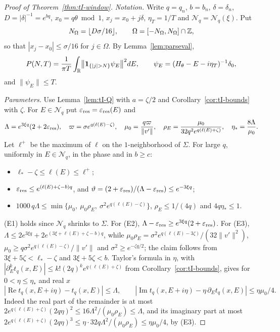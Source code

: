 \begin{proof}[Proof of Theorem~\ref{thm:tI-window}]
\emph{Notation.} Write $q=q_n$, $b=b_n$, $\delta=\delta_n$, $D=|\delta|^{-1}=e^{bq}$, $x_0=q\theta\bmod1$, $x_j=x_0+j\delta$, $\eta_T=1/T$ and $\mathcal N_q=\mathcal N_q(\xi)$. Put
\[
N_\Omega=\lfloor D\sigma/16\rfloor,\qquad\Omega=[-N_\Omega,N_\Omega]\cap\mathbb Z,
\]
so that $|x_j-x_0|\le\sigma/16$ for $j\in\Omega$. By Lemma~\ref{lem:parseval},
\begin{equation}\label{eq:tI-parseval}
P(N,T)=\frac1{\pi T}\int_\R\bigl\|\un_{\{|j|>N\}}\psi_E\bigr\|^2dE,\qquad\psi_E=(H_\theta-E-i\eta_T)^{-1}\delta_0,
\end{equation}
and $\|\psi_E\|\le T$.

\emph{Parameters.} Use Lemma~\ref{lem:tI-Q} with $a=\zeta/2$ and Corollary~\ref{cor:tI-bounds} with $\zeta$. For $E\in\mathcal N_q$ put $\varepsilon_{\mathrm{res}}=\varepsilon_{\mathrm{res}}(E)$ and
\[
\Lambda=e^{3\xi q}(2+2\varepsilon_{\mathrm{res}}),\quad\varpi=\sigma e^{q(\ell(E)-\zeta)},\quad\mu_0=\frac{q\varpi}{\|v'\|},\quad\rho_E=\frac{\mu_0}{32q^2e^{q(\ell(E)+\zeta)}},\quad\eta_*=\frac{8\Lambda}{\mu_0}.
\]
Let $\ell^+$ be the maximum of $\ell$ on the $1$-neighborhood of $\Sigma$. For large $q$, uniformly in $E\in\mathcal N_q$, in the phase and in $b\ge c$:
\begin{itemize}
\item[(E1)] $\ell_*-\zeta\le\ell(E)\le\ell^+$;
\item[(E2)] $\varepsilon_{\mathrm{res}}\le e^{(\ell(E)+\zeta-b)q}$, and $\vartheta=(2+\varepsilon_{\mathrm{res}})/(\Lambda-\varepsilon_{\mathrm{res}})\le e^{-3\xi q}$;
\item[(E3)] $1000\,q\Lambda\le\min\{\mu_0,\ \mu_0\rho_E,\ \sigma^2e^{q(\ell(E)-\zeta)}\}$, $\rho_E\le1/(4q)$ and $4q\eta_*\le1$.
\end{itemize}
(E1) holds since $\mathcal N_q$ shrinks to $\Sigma$. For (E2), $\Lambda-\varepsilon_{\mathrm{res}}\ge e^{3\xi q}(2+\varepsilon_{\mathrm{res}})$. For (E3), $\Lambda\le2e^{3\xi q}+2e^{(3\xi+\ell(E)+\zeta-b)q}$, while $\mu_0\rho_E=\sigma^2e^{q(\ell(E)-3\zeta)}/(32\|v'\|^2)$, $\mu_0\ge q\sigma^2e^{q(\ell(E)-\zeta)}/\|v'\|$ and $\sigma^2\ge e^{-\zeta q/2}$; the claim follows from $3\xi+5\zeta<\ell_*-\zeta$ and $3\xi+5\zeta<b$. Taylor's formula in $\eta$, with $|\partial_E^kt_q(x,E)|\le k!(2q)^ke^{q(\ell(E)+\zeta)}$ from Corollary~\ref{cor:tI-bounds}, gives for $0<\eta\le\eta_*$ and real $x$
\begin{equation}\label{eq:tI-taylor}
|\operatorname{Re}t_q(x,E+i\eta)-t_q(x,E)|\le\Lambda,\qquad|\operatorname{Im}t_q(x,E+i\eta)-\eta\,\partial_Et_q(x,E)|\le\eta\mu_0/4.
\end{equation}
Indeed the real part of the remainder is at most $2e^{q(\ell(E)+\zeta)}(2q\eta)^2\le16\Lambda^2/(\mu_0\rho_E)\le\Lambda$, and its imaginary part at most $2e^{q(\ell(E)+\zeta)}(2q\eta)^3\le\eta\cdot32q\Lambda^2/(\mu_0\rho_E)\le\eta\mu_0/4$, by (E3).


\end{proof}
